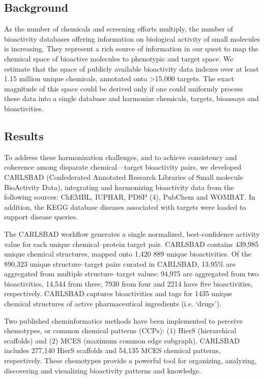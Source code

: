 \subsection{Background}

As the number of chemicals and screening efforts multiply, the number of bioactivity databases offering information on biological activity of small molecules is increasing. They represent a rich source of information in our quest to map the chemical space of bioactive molecules to phenotypic and target space. We estimate that the space of publicly available bioactivity data indexes over at least 1.15 million unique chemicals, annotated onto \textgreater 15,000 targets\cite{Kim_Kjaerulff2013-hi}. The exact magnitude of this space could be derived only if one could uniformly process these data into a single database and harmonize chemicals, targets, bioassays and bioactivities. 

\subsection{Results}

To address these harmonization challenges, and to achieve consistency and coherence among disparate chemical—target bioactivity pairs, we developed CARLSBAD (Confederated Annotated Research Libraries of Small molecule BioActivity Data), integrating and harmonizing bioactivity data from the following sources: ChEMBL\cite{Gaulton2017-gp}, IUPHAR\cite{Harding2018-ut}, PDSP\cite{Roth2000-bh} (4), PubChem\cite{Kim2021-dv} and WOMBAT\cite{Olah2005-zd}. In addition, the KEGG database\cite{Ogata1999-he} diseases associated with targets were loaded to support disease queries.

The CARLSBAD workflow generates a single normalized, best-confidence activity value for each unique chemical–protein target pair. CARLSBAD contains 439,985 unique chemical structures, mapped onto 1,420 889 unique bioactivities. Of the 890,323 unique structure–target pairs curated in CARLSBAD, 13.95\% are aggregated from multiple structure–target values: 94,975 are aggregated from two bioactivities, 14,544 from three, 7930 from four and 2214 have five bioactivities, respectively.  CARLSBAD captures bioactivities and tags for 1435 unique chemical structures of active pharmaceutical ingredients (i.e. ‘drugs’). 

Two published cheminformatics methods have been implemented to perceive chemotypes, or common chemical patterns (CCPs): (1) HierS (hierarchical scaffolds) and (2) MCES (maximum common edge subgraph). CARLSBAD includes 277,140 HierS scaffolds and 54,135 MCES chemical patterns, respectively. These chemotypes provide a powerful tool for organizing, analyzing, discovering and visualizing bioactivity patterns and knowledge.

